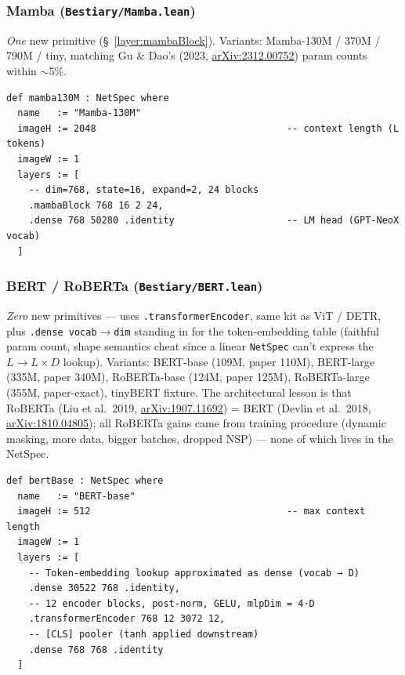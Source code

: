 \subsubsection*{Mamba (\texttt{Bestiary/Mamba.lean})}
\emph{One} new primitive (\S~\ref{layer:mambaBlock}). Variants: Mamba-130M / 370M / 790M /
tiny, matching Gu \& Dao's (2023,
\href{https://arxiv.org/abs/2312.00752}{arXiv:2312.00752}) param counts
within $\sim$5\%.

\begin{verbatim}
def mamba130M : NetSpec where
  name   := "Mamba-130M"
  imageH := 2048                                  -- context length (L tokens)
  imageW := 1
  layers := [
    -- dim=768, state=16, expand=2, 24 blocks
    .mambaBlock 768 16 2 24,
    .dense 768 50280 .identity                    -- LM head (GPT-NeoX vocab)
  ]
\end{verbatim}

\subsubsection*{BERT / RoBERTa (\texttt{Bestiary/BERT.lean})}
\emph{Zero} new primitives --- uses \texttt{.transformerEncoder}, same kit as
ViT / DETR, plus \texttt{.dense vocab$\to$dim} standing in for the
token-embedding table (faithful param count, shape semantics cheat
since a linear \texttt{NetSpec} can't express the $L \to L \times D$
lookup). Variants: BERT-base (109M, paper 110M), BERT-large (335M,
paper 340M), RoBERTa-base (124M, paper 125M), RoBERTa-large (355M,
paper-exact), tinyBERT fixture. The architectural lesson is that
RoBERTa (Liu et al.\ 2019,
\href{https://arxiv.org/abs/1907.11692}{arXiv:1907.11692}) = BERT
(Devlin et al.\ 2018,
\href{https://arxiv.org/abs/1810.04805}{arXiv:1810.04805}); all
RoBERTa gains came from training procedure
(dynamic masking, more data, bigger batches, dropped NSP) --- none
of which lives in the NetSpec.

\begin{verbatim}
def bertBase : NetSpec where
  name   := "BERT-base"
  imageH := 512                                   -- max context length
  imageW := 1
  layers := [
    -- Token-embedding lookup approximated as dense (vocab → D)
    .dense 30522 768 .identity,
    -- 12 encoder blocks, post-norm, GELU, mlpDim = 4·D
    .transformerEncoder 768 12 3072 12,
    -- [CLS] pooler (tanh applied downstream)
    .dense 768 768 .identity
  ]
\end{verbatim}

